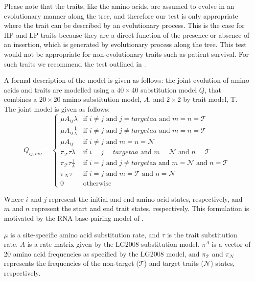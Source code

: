 \documentclass[]{article}
\begin{document}
Please note that the traits, like the amino acids, are assumed to evolve in an evolutionary manner along the tree, and therefore our test is only appropriate where the trait can be described by an evolutionary process. This is the case for HP and LP traits because they are a direct function of the presence or absence of an insertion, which is generated by evolutionary process along the tree. This test would not be appropriate for non-evolutionary traits such as patient survival. For such traits we recommend the test outlined in \citet{bhattacharya2007founder}.

A formal description of the model is given as follows: the joint evolution of amino acids and traits are modelled using a $40\times{40}$ substitution model $Q$, that combines a $20\times{20}$ amino substitution model, $A$, and $2\times{2}$ by trait model, T. The joint model is given as follows:
\begin{equation}
Q_{ij,mn}=\begin{cases}
\mu A_{ij}\lambda & \text{if }i\neq j\text{ and }j=targetaa\text{ and }m=n=\mathcal{T}\\
\mu A_{ij}\frac{1}{\lambda} & \text{if }i\neq j\text{ and }j\neq targetaa\text{ and }m=n=\mathcal{T}\\
\mu A_{ij} & \text{if }i\neq j\text{ and }m=n=\mathcal{N}\\
\pi_{\mathcal{T}}\tau\lambda & \text{if }i=j=targetaa\text{ and }m=\mathcal{N}\text{ and }n=\mathcal{T}\\
\pi_{\mathcal{T}}\tau\frac{1}{\lambda} & \text{if }i=j\text{ and }j\neq target\text{aa and }m=\mathcal{N}\text{ and }n=\mathcal{T}\\
\pi_{\mathcal{N}}\tau & \text{if }i=j\text{ and }m=\mathcal{T}\text{ and }n=\mathcal{N}\\
0 & \text{otherwise}
\end{cases}
\end{equation}

Where $i$ and $j$ represent the initial and end amino acid states, respectively, and $m$ and $n$ represent the start and end trait states, respectively. This formulation is motivated by the RNA base-pairing model of \citet{muse1995evolutionary}.

$\mu$ is a site-specific amino acid substitution rate, and $\tau$ is the trait substitution rate. $A$ is a rate matrix given by the LG2008 substitution model. $\pi^{A}$ is a vector of 20 amino acid frequencies as specified by the LG2008 model, and $\pi_{\mathcal{T}}$ and  $\pi_{\mathcal{N}}$ represents the frequencies of the non-target ($\mathcal{T}$) and target traits ($\mathcal{N}$) states, respectively. 
\end{document}
